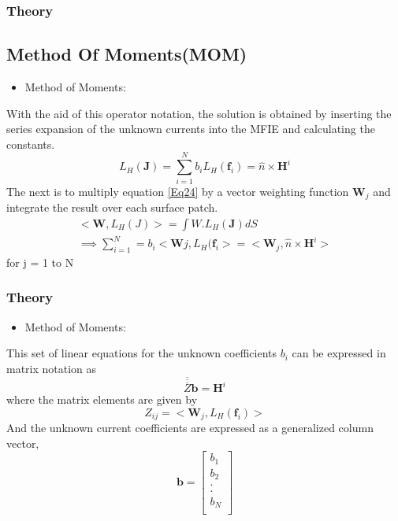 \documentclass{beamer}
\begin{document}
\begin{frame}
\frametitle{Theory}
\subsection{Method Of Moments(MOM)}
\begin{itemize}
\item Method of Moments:
\end{itemize}
With the aid of this operator notation, the solution is obtained by inserting  the series expansion of the unknown currents into the MFIE and calculating the constants.
\begin{equation}
L_H(\textbf{J}) = \sum_{i=1}^N b_i L_H (\textbf{f}_i) = \hat{n}\times \textbf{H}^i
\label{Eq24}
\end{equation}
The next is to multiply equation \ref{Eq24} by a vector weighting function $\textbf{W}_j$ and integrate the result over each surface patch. 
\begin{eqnarray}
<\textbf{W}, L_H(J)> = \int W.L_H(\textbf{J})dS \\
\implies \sum_{i=1}^N = b_i<\textbf{W}j,L_H(\textbf{f}_i> = <\textbf{W}_j,\hat{n}\times\textbf{H}^i>
\end{eqnarray}
for j = 1 to N
\end{frame}
\begin{frame}
\frametitle{Theory}
\begin{itemize}
\item Method of Moments:
\end{itemize}
This set of linear equations for the unknown coefficients $b_i$ can be expressed in matrix notation as 
\begin{equation}
\overline{\overline{\overline{Z}}}\textbf{b} = \textbf{H}^i 
\end{equation}
where the matrix elements are given by
\begin{equation}
Z_{ij} = <\textbf{W}_j,L_H(\textbf{f}_i)>
\end{equation}
And the unknown current coefficients are expressed as a generalized column vector,
\begin{equation}
\textbf{b} = \begin{bmatrix}
b_1 \\
b_2 \\
. \\
. \\
b_N\\
\end{bmatrix}
\end{equation}
\end{frame}
\end{document}
